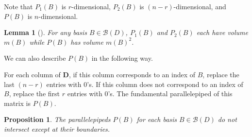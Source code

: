 \documentclass[10pt,a4paper]{amsart}
\newtheorem{lemma}[theorem]{Lemma}
\newtheorem{prop}[theorem]{Proposition}
\theoremstyle{definition}
\newcommand{\D}{\mathbf{D}}
\newcommand{\B}{\mathcal{B}}
\begin{document}
Note that $P_1(B)$ is $r$-dimensional, $P_2(B)$ is $(n-r)$-dimensional, and $P(B)$ is $n$-dimensional. 

\begin{lemma}[{\cite[Lemma~7.1.5]{mythesis}}]\label{lem:pipedvol}For any basis $B\in \mathcal B(D)$, $P_1(B)$ and $P_2(B)$ each have volume $m(B)$ while $P(B)$ has volume $m(B)^2$.
\end{lemma}

We can also describe $P(B)$ in the following way.

For each column of $\D$, if this column corresponds to an index of $B$, replace the last $(n-r)$ entries with 0's. If this column does not correspond to an index of $B$, replace the first $r$ entries with 0's. The fundamental parallelepiped of this matrix is $P(B)$. 

\setcounter{theorem}{6}
\begin{prop}\label{prop:nointersect}
The parallelepipeds $P(B)$ for each basis $B\in \B(D)$ do not intersect except at their boundaries.
\end{prop}
\end{document}
